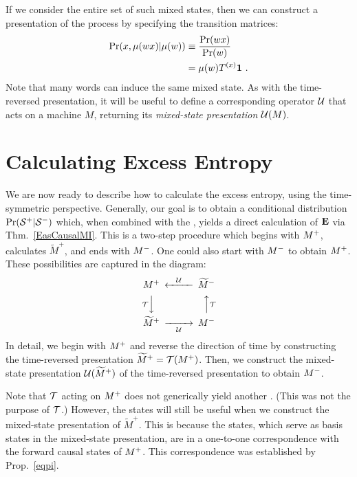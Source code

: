 If we consider the entire set of such mixed states, then we can construct a 
presentation of the process by specifying the transition matrices:
\begin{align}
\Pr({x}, \mu(w{x}) | \mu(w))
  & \equiv \frac{\Pr(wx)}{\Pr(w)} \\
  & = \mu(w) T^{(x)} \mathbf{1} ~.
\end{align}
Note that many words can induce the same mixed state. As with the time-reversed 
presentation, it will be useful to define a
corresponding operator $\mathcal{U}$ that acts on a machine $M$, returning its
\emph{mixed-state presentation} $\mathcal{U}(M)$.

\section{Calculating Excess Entropy}

We are now ready to describe how to calculate the excess entropy, using the
time-symmetric perspective. Generally, our goal is to obtain a conditional
distribution $\Pr({\mathcal{S}}^{+}|{\mathcal{S}}^{-})$ which, when combined
with the \eMs, yields a direct calculation of ${\bf E}$ via Thm.~\ref{EasCausalMI}.
This is a two-step procedure which begins with ${M}^{+}$, calculates
$\widetilde{M}^+$, and ends with ${M}^{-}$. One could also start with ${M}^{-}$
to obtain ${M}^{+}$. These possibilities are captured in the diagram:
\begin{equation}
\begin{CD}
\FutureEM @<\MSP<< \widetilde{M}^-\\
@V\TR{}VV             @AA\TR{}A\\
\widetilde{M}^+ @>>\MSP> \PastEM
\end{CD}
\end{equation}
In detail, we begin with ${M}^{+}$ and reverse the direction of time by 
constructing the time-reversed presentation $\widetilde{M}^+ = \mathcal{T}({M}^{+})$.
Then, we construct the mixed-state presentation $\mathcal{U}(\widetilde{M}^+)$ of the
time-reversed presentation to obtain ${M}^{-}$.

Note that $\mathcal{T}$ acting on ${M}^{+}$ does not generically yield another \eM.
(This was not the purpose of $\mathcal{T}$.) However, the states will still be useful
when we construct the mixed-state presentation of $\widetilde{M}^+$. This is
because the states, which serve as basis states in the mixed-state presentation,
are in a one-to-one correspondence with the forward causal states of
${M}^{+}$. This correspondence was established by Prop.~\ref{eqpi}.

